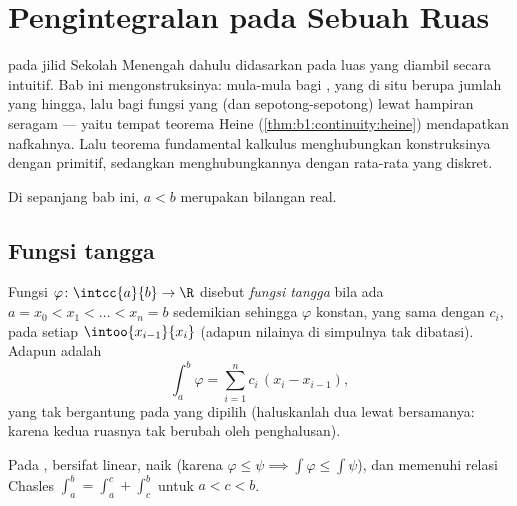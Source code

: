\chapter{Pengintegralan pada Sebuah Ruas}\label{ch:b1:integration}

 pada jilid Sekolah Menengah dahulu didasarkan pada luas yang diambil
secara intuitif. Bab ini mengonstruksinya: mula-mula bagi ,
yang di situ  berupa jumlah yang hingga, lalu bagi fungsi yang  (dan
 sepotong-sepotong) lewat hampiran seragam --- yaitu
tempat teorema Heine (\cref{thm:b1:continuity:heine}) mendapatkan
nafkahnya. Lalu teorema fundamental kalkulus menghubungkan
konstruksinya dengan primitif, sedangkan  menghubungkannya dengan rata-rata
yang diskret.

Di sepanjang bab ini, $a < b$ merupakan bilangan real.

\section{Fungsi tangga}

\begin{definition}\label{def:b1:integration:step}
Fungsi $\varphi \colon \intcc{a}{b} \to \R$ disebut \emph{fungsi
tangga} bila ada  $a = x_0
< x_1 < \dots < x_n = b$ sedemikian sehingga $\varphi$ konstan, yang sama dengan
$c_i$, pada setiap   $\intoo{x_{i-1}}{x_i}$ (adapun nilainya di
simpulnya tak dibatasi). Adapun  adalah
\[
\int_a^b \varphi = \sum_{i=1}^{n} c_i\,(x_i - x_{i-1}),
\]
yang tak bergantung pada  yang dipilih (haluskanlah dua  lewat
 bersamanya: karena kedua ruasnya tak berubah oleh penghalusan).
\end{definition}

\begin{proposition}\label{prop:b1:integration:stepprops}
Pada ,  bersifat linear, naik (karena $\varphi \leq
\psi \implies \int\varphi \leq \int\psi$), dan memenuhi relasi
Chasles $\int_a^b = \int_a^c + \int_c^b$ untuk $a < c < b$.
\end{proposition}

